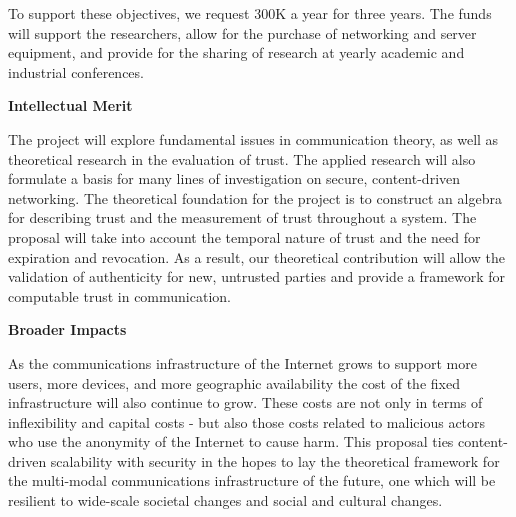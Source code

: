 \documentclass{proposalnsf}
\begin{document}
To support these objectives, we request 300K a year for three years. The funds will support the researchers, allow for the purchase of networking and server equipment, and provide for the sharing of research at yearly academic and industrial conferences.

\noindent
{\large{\bf Intellectual Merit}}

\noindent
The project will explore fundamental issues in communication theory, as well as theoretical research in the evaluation of trust. The applied research will also formulate a basis for many lines of investigation on secure, content-driven networking. The theoretical foundation for the project is to construct an algebra for describing trust and the measurement of trust throughout a system. The proposal will take into account the temporal nature of trust and the need for expiration and revocation. As a result, our theoretical contribution will allow the validation of authenticity for new, untrusted parties and provide a framework for computable trust in communication.

\noindent
{\large{\bf Broader Impacts}}

\noindent
As the communications infrastructure of the Internet grows to support more users, more devices, and more geographic availability the cost of the fixed infrastructure will also continue to grow. These costs are not only in terms of inflexibility and capital costs - but also those costs related to malicious actors who use the anonymity of the Internet to cause harm. This proposal ties content-driven scalability with security in the hopes to lay the theoretical framework for the multi-modal communications infrastructure of the future, one which will be resilient to wide-scale societal changes and social and cultural changes.
\end{document}
